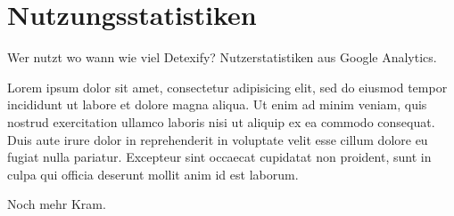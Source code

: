 \chapter{Nutzungsstatistiken} %
\label{cha:nutzungsstatistiken}

\TODO Wer nutzt wo wann wie viel Detexify? Nutzerstatistiken aus Google Analytics.

Lorem ipsum dolor sit amet, consectetur adipisicing elit, sed do eiusmod tempor incididunt ut labore et dolore magna aliqua. Ut enim ad minim veniam, quis nostrud exercitation ullamco laboris nisi ut aliquip ex ea commodo consequat. Duis aute irure dolor in reprehenderit in voluptate velit esse cillum dolore eu fugiat nulla pariatur. Excepteur sint occaecat cupidatat non proident, sunt in culpa qui officia deserunt mollit anim id est laborum.

Noch mehr Kram.

